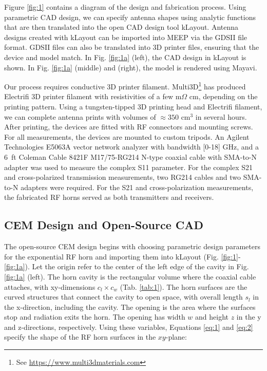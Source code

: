 \documentclass[electronics,article,submit,pdftex,moreauthors]{Definitions/mdpi}
\begin{document}
Figure \ref{fig:1} contains a diagram of the design and fabrication process.  Using parametric CAD design, we can specify antenna shapes using analytic functions that are then translated into the open CAD design tool kLayout.  Antenna designs created with kLayout can be imported into MEEP via the GDSII file format.  GDSII files can also be translated into 3D printer files, ensuring that the device and model match.  In Fig. \ref{fig:1a} (left), the CAD design in kLayout is shown.  In Fig. \ref{fig:1a} (middle) and (right), the model is rendered using Mayavi.

Our process requires conductive 3D printer filament.  Multi3D\footnote{See \url{https://www.multi3dmaterials.com}} has produced Electrifi 3D printer filament with resistivities of a few m$\Omega$ cm, depending on the printing pattern.  Using a tungsten-tipped 3D printing head and Electrifi filament, we can complete antenna prints with volumes of $\approx 350$ cm$^3$ in several hours.  After printing, the devices are fitted with RF connectors and mounting screws.  For all measurements, the devices are mounted to custom tripods.  An Agilent Technologies E5063A vector network analyzer with bandwidth [0-18] GHz, and a 6~ft Coleman Cable 8421F M17/75-RG214 N-type coaxial cable with SMA-to-N adapter was used to measure the complex S11 parameter.  For the complex S21 and cross-polarized transmission measurements, two RG214 cables and two SMA-to-N adapters were required.  For the S21 and cross-polarization measurements, the fabricated RF horns served as both transmitters and receivers.

\subsection{CEM Design and Open-Source CAD}
\label{sec:mat_meth_1}

The open-source CEM design begins with choosing parametric design parameters for the exponential RF horn and importing them into kLayout (Fig. \ref{fig:1}-\ref{fig:1a}).  Let the origin refer to the center of the left edge of the cavity in Fig. \ref{fig:1a} (left).  The horn cavity is the rectangular volume where the coaxial cable attaches, with xy-dimensions $c_l \times c_w$  (Tab. \ref{tab:1}).  The horn surfaces are the curved structures that connect the cavity to open space, with overall length $s_l$ in the x-direction, including the cavity.  The opening is the area where the surfaces stop and radiation exits the horn.  The opening has width $w$ and height $z$ in the y and z-directions, respectively.  Using these variables, Equations \ref{eq:1} and \ref{eq:2} specify the shape of the RF horn surfaces in the $xy$-plane:
\end{document}
